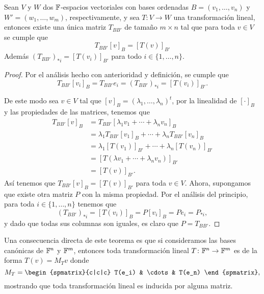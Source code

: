 \begin{teor} \label{teor:MatTrLin}
  Sean $V$ y $W$ dos $\mathbb{F}$-espacios vectoriales con bases ordenadas $B = (v_1,\ldots,v_n)$ y $W' = (w_1,\ldots,w_m)$, respectivamente, y sea $T\colon V \to W$ una transformación lineal, entonces existe una única matriz $T_{BB'}$ de tamaño $m\times n$ tal que para toda $v \in V$ se cumple que
    \[ T_{BB'} [v]_B = [T(v)]_{B'} \]
  Además $(T_{BB'})_{*i} = [T(v_i)]_{B'}$ para todo $i \in \{1,\ldots,n\}$.
\end{teor}
\begin{proof}
  Por el análisis hecho con anterioridad y definición, se cumple que
  \[ T_{BB'} [v_i]_B = T_{BB'} e_i = (T_{BB'})_{*i} = [T(v_i)]_{B'}. \]
  
  De este modo sea $v \in V$ tal que $[v]_B = (\lambda_1,\ldots,\lambda_n)^t$, por la linealidad de $[\cdot]_B$ y las propiedades de las matrices, tenemos que
  \begin{align*}
    T_{BB'}[v]_B &= T_{BB'}[\lambda_1v_1 + \cdots + \lambda_n v_n]_B \\
      &= \lambda_1 T_{BB'} [v_1]_B + \cdots + \lambda_n T_{BB'} [v_n]_B \\
      &= \lambda_1 [T(v_1)]_{B'} + \cdots + \lambda_n [T(v_n)]_{B'} \\
      &= [T(\lambda v_1  + \cdots + \lambda_n v_n )]_{B'} \\
      &= [T(v)]_{B'}.
  \end{align*}
  Así tenemos que $T_{BB'} [v]_B = [T(v)]_{B'}$ para toda $v \in V$. Ahora, supongamos que existe otra matriz $P$ con la misma propiedad. Por el análisis del principio, para toda $i \in \{1,\ldots,n\}$ tenemos que
  \[ (T_{BB'})_{*i} = [T(v_i)]_B = P[v_i]_B = Pe_i = P_{*i}, \]
  y dado que todas sus columnas son iguales, es claro que $P = T_{BB'}$.
\end{proof}

Una consecuencia directa de este teorema es que si consideramos las bases canónicas de $\mathbb{F}^n$ y $\mathbb{F}^m$, entonces toda transformación lineal $T\colon \mathbb{F}^n \to \mathbb{F}^m$ es de la forma $T(v) = M_T v$ donde
  \[ M_T = \begin{spmatrix}{c|c|c} T(e_i) & \cdots & T(e_n) \end{spmatrix}, \]
mostrando que toda transformación lineal es inducida por alguna matriz.

